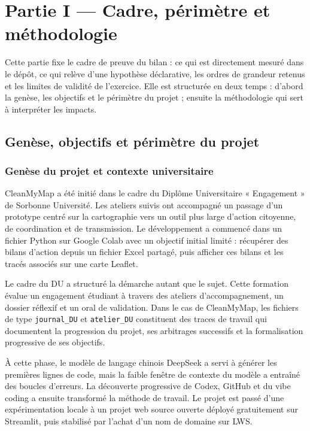 \documentclass[
  10pt,
  a4paper,
  DIV=11,
  numbers=noendperiod,
  oneside]{scrreprt}
\begin{document}
\newpage{}

\chapter{Partie I --- Cadre, périmètre et
méthodologie}\label{partie-i-cadre-perimetre-et-methode}

Cette partie fixe le cadre de preuve du bilan : ce qui est directement
mesuré dans le dépôt, ce qui relève d'une hypothèse déclarative, les
ordres de grandeur retenus et les limites de validité de l'exercice.
Elle est structurée en deux temps : d'abord la genèse, les objectifs et
le périmètre du projet ; ensuite la méthodologie qui sert à interpréter
les impacts.

\section{Genèse, objectifs et périmètre du
projet}\label{genuxe8se-objectifs-et-puxe9rimuxe8tre-du-projet}

\subsection{Genèse du projet et contexte
universitaire}\label{genuxe8se-du-projet-et-contexte-universitaire}

CleanMyMap a été initié dans le cadre du Diplôme Universitaire «
Engagement » de Sorbonne Université. Les ateliers suivis ont accompagné
un passage d'un prototype centré sur la cartographie vers un outil plus
large d'action citoyenne, de coordination et de transmission. Le
développement a commencé dans un fichier Python sur Google Colab avec un
objectif initial limité : récupérer des bilans d'action depuis un
fichier Excel partagé, puis afficher ces bilans et les tracés associés
sur une carte Leaflet.

Le cadre du DU a structuré la démarche autant que le sujet. Cette
formation évalue un engagement étudiant à travers des ateliers
d'accompagnement, un dossier réflexif et un oral de validation. Dans le
cas de CleanMyMap, les fichiers de type \texttt{journal\_DU} et
\texttt{atelier\_DU} constituent des traces de travail qui documentent
la progression du projet, ses arbitrages successifs et la formalisation
progressive de ses objectifs.

À cette phase, le modèle de langage chinois DeepSeek a servi à générer
les premières lignes de code, mais la faible fenêtre de contexte du
modèle a entraîné des boucles d'erreurs. La découverte progressive de
Codex, GitHub et du vibe coding a ensuite transformé la méthode de
travail. Le projet est passé d'une expérimentation locale à un projet
web source ouverte déployé gratuitement sur Streamlit, puis stabilisé
par l'achat d'un nom de domaine sur LWS.
\end{document}
